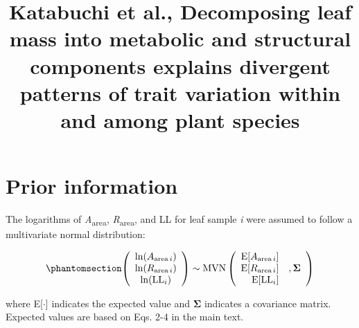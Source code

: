 \documentclass[
  12pt,
  letterpaper,
  DIV=11,
  numbers=noendperiod]{scrartcl}
\title{Katabuchi et al., Decomposing leaf mass into metabolic and
structural components explains divergent patterns of trait variation
within and among plant species}
\author{}
\date{}
\numberwithin{equation}{section}
\renewcommand*\contentsname{Table of contents}
\newcommand\contentsname{Table of contents}
\begin{document}
\maketitle

\renewcommand*\contentsname{Table of contents}
{
\hypersetup{linkcolor=}
\setcounter{tocdepth}{3}
\tableofcontents
}

\section{Prior information}\label{prior-information}

The logarithms of \emph{A}\textsubscript{area},
\emph{R}\textsubscript{area}, and LL for leaf sample \emph{i} were
assumed to follow a multivariate normal distribution:

\begin{equation}\phantomsection\label{eq-mvn}{
\begin{aligned}
\left(
\begin{array}{ccc}
\mathrm{ln}(A_{\mathrm{area} \, i})\\
\mathrm{ln}(R_{\mathrm{area} \, i}) \\
\mathrm{ln}(\mathrm{LL}_i)
\end{array}
\right)
\sim \mathrm{MVN}
\left(
\begin{array}{rrr}
\mathrm{E}[A_{\mathrm{area} \, i}] & \\
\mathrm{E}[R_{\mathrm{area} \, i}] &, \boldsymbol{\Sigma}\\
\mathrm{E}[\mathrm{LL}_i] &
\end{array}
\right)
\end{aligned}
}\end{equation}

where E{[}\(\cdot\){]} indicates the expected value and
\(\boldsymbol{\Sigma}\) indicates a covariance matrix. Expected values
are based on Eqs. 2-4 in the main text.
\end{document}
